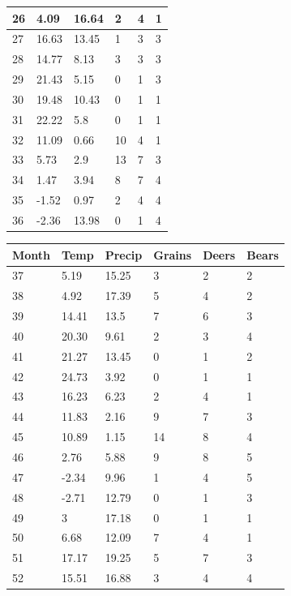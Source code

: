 \documentclass[12pt]{article} %
\begin{document}
\begin{enumerate}
\begin{center}
\begin{tabular}{ | l | l | l | l | l | l | }
				26 & 4.09 & 16.64 & 2 & 4 & 1 \\ \hline
				27 & 16.63 & 13.45 & 1 & 3 & 3 \\ \hline
				28 & 14.77 & 8.13 & 3 & 3 & 3 \\ \hline
				29 & 21.43 & 5.15 & 0 & 1 & 3 \\ \hline
				30 & 19.48 & 10.43 & 0 & 1 & 1 \\ \hline
				31 & 22.22 & 5.8 & 0 & 1 & 1 \\ \hline			
				32 & 11.09 & 0.66 & 10 & 4 & 1 \\ \hline
				33 & 5.73 & 2.9 & 13 & 7 & 3 \\ \hline
				34 & 1.47 & 3.94 & 8 & 7 & 4 \\ \hline
				35 & -1.52 & 0.97 & 2 & 4 & 4 \\ \hline
				36 & -2.36 & 13.98 & 0 & 1 & 4 \\ \hline
			\end{tabular}
		\end{center}			
		\begin{center}
			\begin{tabular}{ | l | l | l | l | l | l | } \hline
				Month & Temp & Precip & Grains & Deers & Bears \\ \hline
				37 & 5.19 & 15.25 & 3 & 2 & 2 \\ \hline
				38 & 4.92 & 17.39 & 5 & 4 & 2 \\ \hline
				39 & 14.41 & 13.5 & 7 & 6 & 3 \\ \hline
				40 & 20.30 & 9.61 & 2 & 3 & 4 \\ \hline
				41 & 21.27 & 13.45 & 0 & 1 & 2 \\ \hline
				42 & 24.73 & 3.92 & 0 & 1 & 1 \\ \hline
				43 & 16.23 & 6.23 & 2 & 4 & 1 \\ \hline
				44 & 11.83 & 2.16 & 9 & 7 & 3 \\ \hline
				45 & 10.89 & 1.15 & 14 & 8 & 4 \\ \hline
				46 & 2.76 & 5.88 & 9 & 8 & 5 \\ \hline
				47 & -2.34 & 9.96 & 1 & 4 & 5 \\ \hline
				48 & -2.71 & 12.79 & 0 & 1 & 3 \\ \hline
				49 & 3 & 17.18 & 0 & 1 & 1 \\ \hline
				50 & 6.68 & 12.09 & 7 & 4 & 1 \\ \hline
				51 & 17.17 & 19.25 & 5 & 7 & 3 \\ \hline
				52 & 15.51 & 16.88 & 3 & 4 & 4 \\ \hline

\end{tabular}
\end{center}
\end{enumerate}
\end{document}
